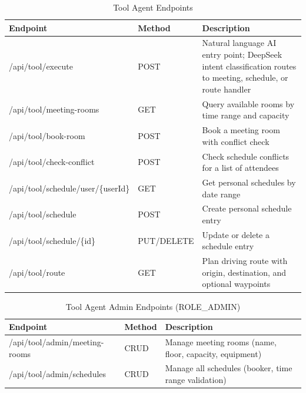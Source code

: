\begin{table}[H]
\small\singlespacing
\centering
\caption{Tool Agent Endpoints}
\label{tab:api-tool}
\begin{tabularx}{\textwidth}{>{\RaggedRight\arraybackslash}p{}>{\RaggedRight\arraybackslash}p{2.0cm}>{\RaggedRight\arraybackslash}X}
\toprule
\textbf{Endpoint} & \textbf{Method} & \textbf{Description} \\
\midrule
/api/tool/execute & POST & Natural language AI entry point; DeepSeek intent classification routes to meeting, schedule, or route handler \\
/api/tool/meeting-rooms & GET & Query available rooms by time range and capacity \\
/api/tool/book-room & POST & Book a meeting room with conflict check \\
/api/tool/check-conflict & POST & Check schedule conflicts for a list of attendees \\
/api/tool/schedule/user/\{userId\} & GET & Get personal schedules by date range \\
/api/tool/schedule & POST & Create personal schedule entry \\
/api/tool/schedule/\{id\} & PUT/DELETE & Update or delete a schedule entry \\
/api/tool/route & GET & Plan driving route with origin, destination, and optional waypoints \\
\bottomrule
\end{tabularx}
\end{table}

\begin{table}[H]
\small\singlespacing
\centering
\caption{Tool Agent Admin Endpoints (ROLE\_ADMIN)}
\label{tab:api-tool-admin}
\begin{tabularx}{\textwidth}{>{\RaggedRight\arraybackslash}p{}>{\RaggedRight\arraybackslash}p{2.0cm}>{\RaggedRight\arraybackslash}X}
\toprule
\textbf{Endpoint} & \textbf{Method} & \textbf{Description} \\
\midrule
/api/tool/admin/meeting-rooms & CRUD & Manage meeting rooms (name, floor, capacity, equipment) \\
/api/tool/admin/schedules & CRUD & Manage all schedules (booker, time range validation) \\
\bottomrule
\end{tabularx}
\end{table}


